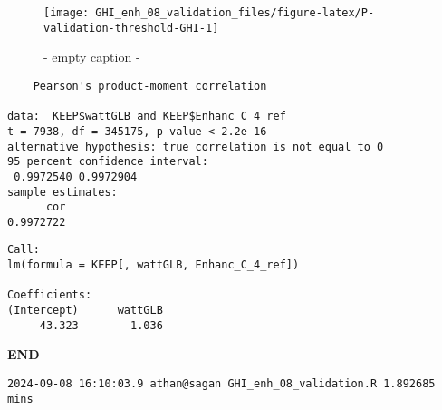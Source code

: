 \documentclass[
  10pt,
  a4paper,oneside]{article}
\begin{document}
\newpage

\begin{figure}[H]

{\centering \texttt{[image: GHI\_enh\_08\_validation\_files/figure-latex/P-validation-threshold-GHI-1]} 

}

\caption{ - empty caption - }\label{fig:P-validation-threshold-GHI}
\end{figure}

\begin{verbatim}
    Pearson's product-moment correlation

data:  KEEP$wattGLB and KEEP$Enhanc_C_4_ref
t = 7938, df = 345175, p-value < 2.2e-16
alternative hypothesis: true correlation is not equal to 0
95 percent confidence interval:
 0.9972540 0.9972904
sample estimates:
      cor 
0.9972722 
\end{verbatim}

\begin{verbatim}
Call:
lm(formula = KEEP[, wattGLB, Enhanc_C_4_ref])

Coefficients:
(Intercept)      wattGLB  
     43.323        1.036  
\end{verbatim}

\textbf{END}

\begin{verbatim}
2024-09-08 16:10:03.9 athan@sagan GHI_enh_08_validation.R 1.892685 mins
\end{verbatim}
\end{document}

